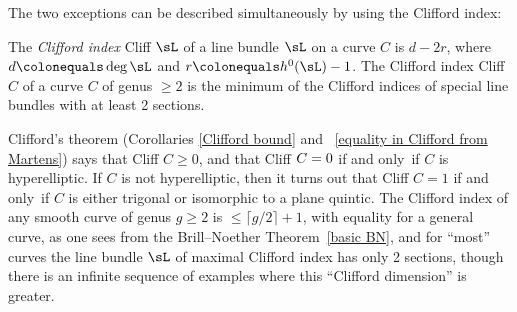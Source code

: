The two exceptions can be described simultaneously by using the 
%
Clifford index:

\begin{definition}
The \emph{Clifford index} Cliff $\sL$ of a line bundle $\sL$ on a curve
%
$C$ is $d-2r$, where $d \colonequals  \deg \sL$ and $r \colonequals
h^0(\sL)-1$. The Clifford index Cliff $C$ of
a curve $C$ of genus $\geq 2$ is the minimum of the Clifford indices
of special line bundles with at least 2 sections.
\unif
\end{definition}

Clifford's theorem (Corollaries \ref{Clifford bound} and ~\ref{equality
in Clifford from Martens}) says that Cliff $C \geq 0$, and that Cliff $C =
\index{Clifford's theorem}%
0$ if and only~if $C$ is hyperelliptic. If $C$ is not hyperelliptic, then
it turns out that Cliff $C=1$ if and only~if $C$ is either trigonal or
isomorphic to a plane quintic. The Clifford index of any smooth curve of
genus $g\geq 2$ is $\leq \lceil g/2\rceil+1$, with equality for a general
curve, as one sees from the Brill--Noether Theorem~\ref{basic BN}, and for
``most'' curves the line bundle $\sL$ of maximal Clifford index has only
2 sections, though there is an infinite sequence of examples where this
``Clifford dimension'' is greater.


